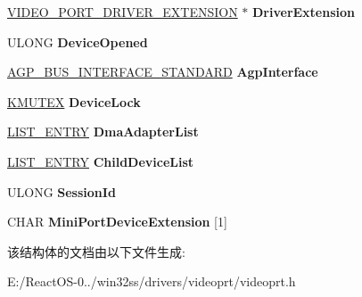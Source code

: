 \begin{DoxyCompactItemize}
\hyperlink{struct___v_i_d_e_o___p_o_r_t___d_r_i_v_e_r___e_x_t_e_n_s_i_o_n}{V\+I\+D\+E\+O\+\_\+\+P\+O\+R\+T\+\_\+\+D\+R\+I\+V\+E\+R\+\_\+\+E\+X\+T\+E\+N\+S\+I\+ON} $\ast$ {\bfseries Driver\+Extension}
\item 
\mbox{\label{struct___v_i_d_e_o___p_o_r_t___d_e_v_i_c_e___e_x_t_e_n_s_t_i_o_n_a7ec7ef13446e81c98365dabe3ccfcf23}} 
U\+L\+O\+NG {\bfseries Device\+Opened}
\item 
\mbox{\label{struct___v_i_d_e_o___p_o_r_t___d_e_v_i_c_e___e_x_t_e_n_s_t_i_o_n_ab6d545765d57f7f0deec7b3ba1e7970c}} 
\hyperlink{struct___a_g_p___b_u_s___i_n_t_e_r_f_a_c_e___s_t_a_n_d_a_r_d}{A\+G\+P\+\_\+\+B\+U\+S\+\_\+\+I\+N\+T\+E\+R\+F\+A\+C\+E\+\_\+\+S\+T\+A\+N\+D\+A\+RD} {\bfseries Agp\+Interface}
\item 
\mbox{\label{struct___v_i_d_e_o___p_o_r_t___d_e_v_i_c_e___e_x_t_e_n_s_t_i_o_n_af30a39c32709e124272e43f8841846c8}} 
\hyperlink{struct___k_m_u_t_a_n_t}{K\+M\+U\+T\+EX} {\bfseries Device\+Lock}
\item 
\mbox{\label{struct___v_i_d_e_o___p_o_r_t___d_e_v_i_c_e___e_x_t_e_n_s_t_i_o_n_aabe14958318b6f7a35fc936b1e254719}} 
\hyperlink{struct___l_i_s_t___e_n_t_r_y}{L\+I\+S\+T\+\_\+\+E\+N\+T\+RY} {\bfseries Dma\+Adapter\+List}
\item 
\mbox{\label{struct___v_i_d_e_o___p_o_r_t___d_e_v_i_c_e___e_x_t_e_n_s_t_i_o_n_a3f49385d68e4904086f1436a9f7b61fe}} 
\hyperlink{struct___l_i_s_t___e_n_t_r_y}{L\+I\+S\+T\+\_\+\+E\+N\+T\+RY} {\bfseries Child\+Device\+List}
\item 
\mbox{\label{struct___v_i_d_e_o___p_o_r_t___d_e_v_i_c_e___e_x_t_e_n_s_t_i_o_n_a89dda7b444796c29c4c01c18effa310d}} 
U\+L\+O\+NG {\bfseries Session\+Id}
\item 
\mbox{\label{struct___v_i_d_e_o___p_o_r_t___d_e_v_i_c_e___e_x_t_e_n_s_t_i_o_n_a468dc82ace39aa6063352734a8900047}} 
C\+H\+AR {\bfseries Mini\+Port\+Device\+Extension} \mbox{[}1\mbox{]}
\end{DoxyCompactItemize}


该结构体的文档由以下文件生成\+:\begin{DoxyCompactItemize}
\item 
E\+:/\+React\+O\+S-\/0../win32ss/drivers/videoprt/videoprt.\+h\end{DoxyCompactItemize}
